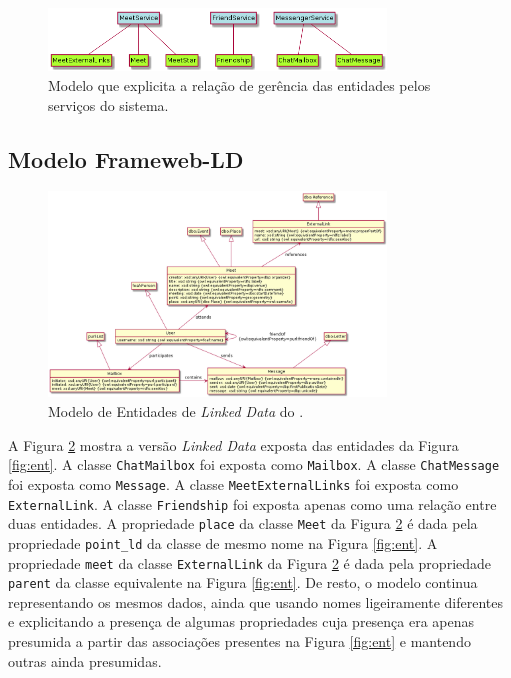 \begin{figure}[H]
	\centering
	\includegraphics[width=0.8\textwidth]{figuras/entidade-servico-escrita.png}
	\caption{Modelo que explicita a relação de gerência das entidades pelos serviços do sistema.}
	\label{fig:ese}
\end{figure}

\subsection{Modelo Frameweb-LD}

\begin{figure}[H]
	\centering
	\includegraphics[width=0.8\textwidth]{figuras/framewebld.png}
	\caption{Modelo de Entidades de \textit{Linked Data} do \imprimirtitulo.}
	\label{fig:ld}
\end{figure}

A Figura \ref{fig:ld} mostra a versão \textit{Linked Data} exposta das entidades da Figura \ref{fig:ent}.
A classe \texttt{ChatMailbox} foi exposta como \texttt{Mailbox}.
A classe \texttt{ChatMessage} foi exposta como \texttt{Message}.
A classe \texttt{MeetExternalLinks} foi exposta como \texttt{ExternalLink}.
A classe \texttt{Friendship} foi exposta apenas como uma relação entre duas entidades.
A propriedade \texttt{place} da classe \texttt{Meet} da Figura \ref{fig:ld} é dada pela propriedade \texttt{point\_ld} da classe de mesmo nome na Figura \ref{fig:ent}.
A propriedade \texttt{meet} da classe \texttt{ExternalLink} da Figura \ref{fig:ld} é dada pela propriedade \texttt{parent} da classe equivalente na Figura \ref{fig:ent}.
De resto, o modelo continua representando os mesmos dados, ainda que usando nomes ligeiramente diferentes e explicitando a presença de algumas propriedades cuja presença era apenas presumida a partir das associações presentes na Figura \ref{fig:ent} e mantendo outras ainda presumidas.

%
